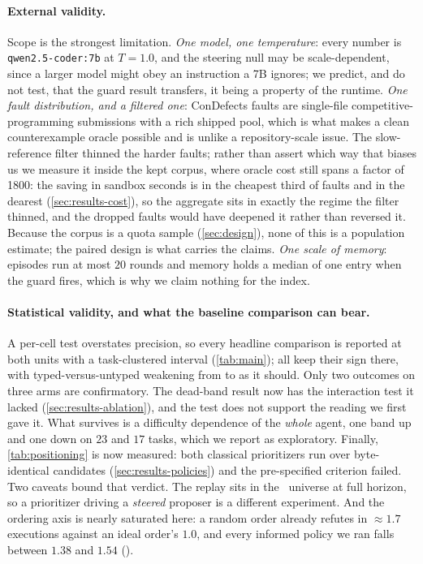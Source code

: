 \paragraph{External validity.}
Scope is the strongest limitation. \emph{One model, one temperature}: every
number is \texttt{qwen2.5-coder:7b} at $T = 1.0$, and the steering null may be
scale-dependent, since a larger model might obey an instruction a 7B ignores;
we predict, and do not test, that the guard result transfers, it being a
property of the runtime. \emph{One fault distribution, and a filtered one}:
ConDefects faults are single-file competitive-programming submissions with a
rich shipped pool, which is what makes a clean counterexample oracle possible
and is unlike a repository-scale issue. The slow-reference filter thinned the
harder faults; rather than assert which way that biases us we measure it inside
the kept corpus, where oracle cost still spans a factor of \num{1800}: the
saving in sandbox seconds is  in the cheapest third of faults and
 in the dearest (\cref{sec:results-cost}), so the aggregate sits in
exactly the regime the filter thinned, and the dropped faults would have
deepened it rather than reversed it. Because the corpus is a quota sample (\cref{sec:design}), none of
this is a population estimate; the paired design is what carries the claims. \emph{One scale of memory}: episodes run at most $20$ rounds and
memory holds a median of one entry when the guard fires, which is why we claim
nothing for the index.

\paragraph{Statistical validity, and what the baseline comparison can bear.}
A per-cell test overstates precision, so every headline comparison is reported
at both units with a task-clustered interval (\cref{tab:main}); all keep their
sign there, with typed-versus-untyped weakening from  to
 as it should. Only two outcomes on three arms are confirmatory.
The dead-band result now has the interaction test it lacked
(\cref{sec:results-ablation}), and the test does not support the reading we
first gave it. What survives is a difficulty dependence of the \emph{whole}
agent, one band up and one down on $23$ and $17$ tasks, which we report as
exploratory. Finally, \cref{tab:positioning} is now measured: both classical prioritizers
run over byte-identical candidates (\cref{sec:results-policies}) and the
pre-specified criterion failed. Two caveats bound that verdict. The replay sits
in the \armnomem\ universe at full horizon, so a prioritizer driving a
\emph{steered} proposer is a different experiment. And the ordering axis is nearly
saturated here: a random order already refutes in ${\approx}1.7$ executions
against an ideal order's $1.0$, and every informed policy we ran falls between
$1.38$ and $1.54$ ().

